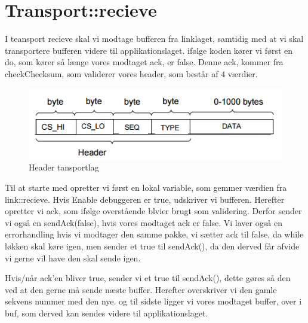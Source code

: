 \graphicspath{{Chapters/Motormontering/}}

\chapter{Transport::recieve}

\lstset{language=C++}          %

I teansport recieve skal vi modtage bufferen fra linklaget, samtidig med at vi skal transportere bufferen videre til applikationslaget. 
ifølge koden kører vi først en do, som kører så længe vores modtaget ack, er false. Denne ack, kommer fra checkChecksum, som validerer vores header, som består af 4 værdier. 
\begin{figure}[H]
\centering
\includegraphics[width = 300 pt]{Img/header.PNG}
\caption{Header tansportlag}
\label{fig:konceptbillede}
\end{figure}

Til at starte med opretter vi først en lokal variable, som gemmer værdien fra link::recieve. 
Hvis Enable debuggeren er true, udskriver vi bufferen. Herefter opretter vi ack, som ifølge overstående blvier brugt som validering. Derfor sender vi også en sendAck(false), hvis vores modtaget ack er false. Vi laver også en errorhandling hvis vi modtager den samme pakke, vi sætter ack til false, da while løkken skal køre igen, men sender et true til sendAck(), da den derved får afvide vi gerne vil have den skal sende igen. 

Hvis/når ack'en bliver true, sender vi et true til sendAck(), dette gøres så den ved at den gerne må sende næste buffer. 
Herefter overskriver vi den gamle sekvens nummer med den nye. og til sidste ligger vi vores modtaget buffer, over i buf, som derved kan sendes videre til applikationslaget. 

